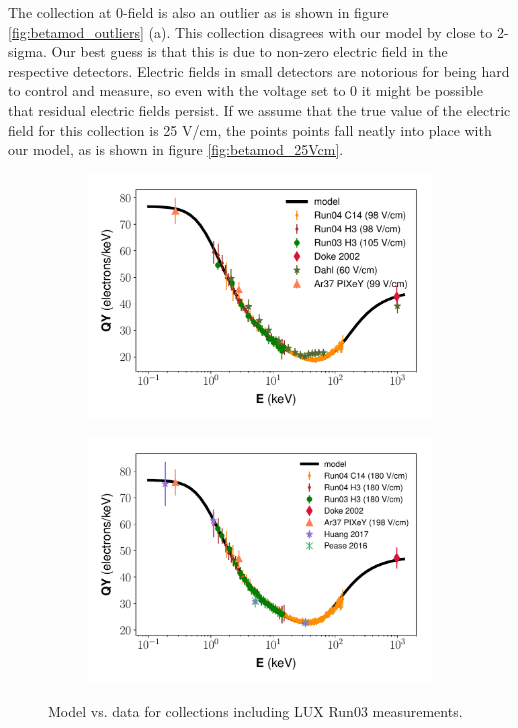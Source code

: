 The collection at 0-field is also an outlier as is shown in figure  \ref{fig:betamod_outliers} (a). This collection disagrees with our model by close to 2-sigma. Our best guess is that this is due to non-zero electric field in the respective detectors. Electric fields in small detectors are notorious for being hard to control and measure, so even with the voltage set to 0 it might be possible that residual electric fields persist. If we assume that the true value of the electric field for this collection is 25 V/cm, the points points fall neatly into place with our model, as is shown in figure \ref{fig:betamod_25Vcm}.
\begin{figure}[!h]
\centering
\begin{subfigure}{0.5\linewidth}
\includegraphics[width=\linewidth]{Figures/Yields_fit_new/NEST_fit_98Vcm_new.pdf}
\caption{}
\end{subfigure}%
\begin{subfigure}{0.5\linewidth}
\includegraphics[width=\linewidth]{Figures/Yields_fit_new/NEST_fit_180Vcm_new.pdf}
\caption{}
\end{subfigure}
\caption{Model vs. data for collections including LUX Run03 measurements.}
\label{fig:betamod_run03comp}
\end{figure}

